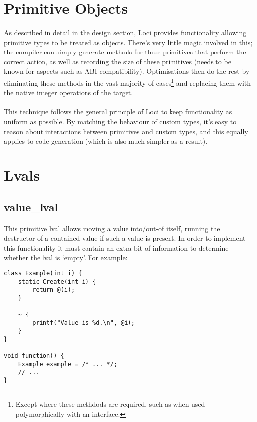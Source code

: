 \documentclass[12pt,twoside,notitlepage]{report}
\begin{document}
\section{Primitive Objects}

\paragraph{}
As described in detail in the design section, Loci provides functionality allowing primitive types to be treated as objects. There's very little magic involved in this; the compiler can simply generate methods for these primitives that perform the correct action, as well as recording the size of these primitives (needs to be known for aspects such as ABI compatibility). Optimisations then do the rest by eliminating these methods in the vast majority of cases\footnote{Except where these methdods are required, such as when used polymorphically with an interface.} and replacing them with the native integer operations of the target.

\paragraph{}
This technique follows the general principle of Loci to keep functionality as uniform as possible. By matching the behaviour of custom types, it's easy to reason about interactions between primitives and custom types, and this equally applies to code generation (which is also much simpler as a result).

\section{Lvals}

\subsection{value\_lval}

\paragraph{}
This primitive lval allows moving a value into/out-of itself, running the destructor of a contained value if such a value is present. In order to implement this functionality it must contain an extra bit of information to determine whether the lval is `empty'. For example:

\begin{lstlisting}
class Example(int i) {
	static Create(int i) {
		return @(i);
	}
	
	~ {
		printf("Value is %d.\n", @i);
	}
}

void function() {
	Example example = /* ... */;
	// ...
}
\end{lstlisting}
\end{document}
